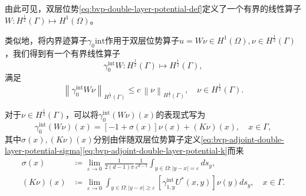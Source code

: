 由此可见，双层位势\eqref{eq:bvp-double-layer-potential-def}定义了一个有界的线性算子$W : H^{\frac{1}{2}}(\Gamma) \mapsto H^{1}(\Omega)$。

类似地，将内界迹算子$\gamma_{0}{\text{int}}$作用于双层位势算子$u = W \nu \in H^{1}(\Omega), \nu \in H^{\frac{1}{2}}(\Gamma)$，我们得到有一个有界线性算子
\begin{equation*}
  \gamma_{0}^{\text{int}} W : H^{\frac{1}{2}}(\Gamma) \mapsto H^{\frac{1}{2}}(\Gamma),
\end{equation*}
满足
\begin{equation*}
  \left\| \gamma_{0}^{\text{int}} W \nu \right\|_{H^{\frac{1}{2}}(\Gamma)}
  \le c \, \left\| \nu \right\|_{H^{\frac{1}{2}}(\Gamma)}, \quad \nu \in H^{\frac{1}{2}}(\Gamma).
\end{equation*}

\begin{lemma}
  \label{lemma:bvp-double-layer-gamma0-representation-formula}
  对于$\nu \in H^{\frac{1}{2}}(\Gamma)$，可以将$\gamma_{0}^{\text{int}} \left( W \nu \right)(x)$的表现式写为
\begin{equation}
  \label{eq:bvp-double-layer-gamma0-representation-formula}
  \gamma_{0}^{\text{int}} \left( W \nu \right)(x) =
  \left[
  - 1 + \sigma(x)
  \right]
  \nu(x) + \left( K \nu \right) (x),
  \quad x \in \Gamma,
\end{equation}
其中$\sigma(x), \left(K \nu  \right) (x)$分别由伴随双层位势算子定义\eqref{eq:bvp-adjoint-double-layer-potential-sigma}\eqref{eq:bvp-adjoint-double-layer-potential-k}而来
\begin{align}
  \label{eq:bvp-double-layer-potential-sigma}
  \sigma(x) &\coloneqq
  \lim_{\varepsilon \rightarrow 0}
  \frac{1}{2(d-1) \pi}
  \frac{1}{\varepsilon^{d-1}}
  \int_{y \in \Omega: \left| y - x \right| = \varepsilon}
  d s_y, \\
  \label{eq:bvp-double-layer-potential-k}
  \left( K \nu \right) (x) & \coloneqq
  \lim_{\varepsilon \rightarrow 0}
  \int_{y \in \Omega: \left| y - x \right| \ge \varepsilon}
  \left[
  \gamma_{1,y}^{\text{int}}
  U^{*}(x,y)
  \right]
  \nu(y)
  d s_y, \quad x \in \Gamma.
\end{align}
\end{lemma}
